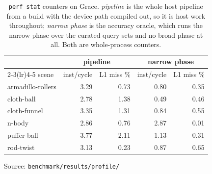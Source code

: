 \begin{table}[!tb]
  \centering
  \caption{\texttt{perf stat} counters on Grace. \emph{pipeline} is the whole
    host pipeline from a build with the device path compiled out, so it is host
    work throughout; \emph{narrow phase} is the accuracy oracle, which runs the
    narrow phase over the curated query sets and no broad phase at all. Both are
    whole-process counters.}
  \label{tab:counters-host}
  \begin{tabular}{lrrrr}
    \toprule
    & \multicolumn{2}{c}{pipeline} & \multicolumn{2}{c}{narrow phase} \\
    \cmidrule(lr){2-3}\cmidrule(lr){4-5}
    scene & inst/cycle & L1 miss \% & inst/cycle & L1 miss \% \\
    \midrule
    armadillo-rollers & 3.29 & 0.73 & 0.80 & 0.35 \\
    cloth-ball & 2.78 & 1.38 & 0.49 & 0.46 \\
    cloth-funnel & 3.35 & 1.31 & 0.84 & 0.55 \\
    n-body & 2.86 & 0.76 & 2.87 & 0.01 \\
    puffer-ball & 3.77 & 2.11 & 1.13 & 0.31 \\
    rod-twist & 3.13 & 0.23 & 0.87 & 0.65 \\
    \bottomrule
  \end{tabular}
  \par\smallskip\footnotesize Source: \texttt{benchmark/results/profile/}
\end{table}
